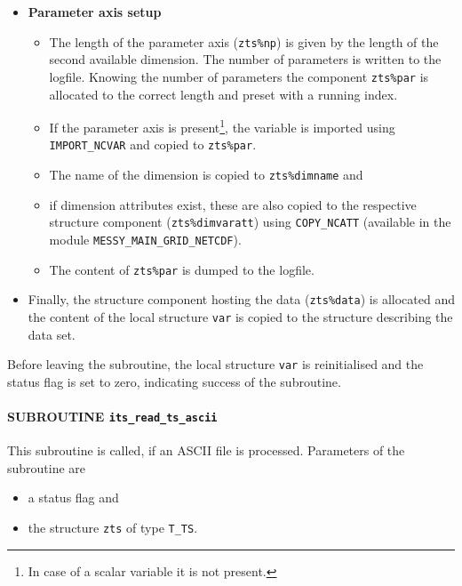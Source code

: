 \documentclass[11pt,twoside]{report}
\begin{document}
\begin{itemize}
\begin{itemize}
{to ``days'') is required (i.e., 24). The offset between the start date
and time (``2000-08-01 00:00:00'') and the 0th julian day is calculated.}.
\end{itemize}
\item {\bf Parameter axis setup}
\begin{itemize}
\item The length of the parameter axis (\verb|zts%np|) is given by the
length of the  
second available dimension. The number of parameters is written to the logfile.
Knowing the number of parameters the component \verb|zts%par| is allocated to 
the correct length and preset with a running index.
\item If the parameter axis is present\footnote{In case of a scalar
variable it is not present.}, the variable is imported
using \verb|IMPORT_NCVAR| and copied to  \verb|zts%par|. 
\item The name of the dimension is copied to
\verb|zts%dimname| and 
\item if dimension attributes exist, these are also copied
to the respective structure component (\verb|zts%dimvaratt|) using 
\verb|COPY_NCATT| (available in the module \verb|MESSY_MAIN_GRID_NETCDF|).
\item The content of  \verb|zts%par| is dumped to the logfile.
\end{itemize}

\item Finally, the structure component hosting the data
(\verb|zts%data|) is allocated and the 
content of the local structure \verb|var| is copied to the structure
describing the data set.
\end{itemize}

 Before leaving the subroutine, the local structure \verb|var| is reinitialised
 and the status flag is set to zero, indicating success of the
 subroutine.

\paragraph{SUBROUTINE \color{blue} \tt\bf its\_read\_ts\_ascii\label{ITSreadasc}\\}
This subroutine is called, if an ASCII file is processed. Parameters of the
subroutine are 
\begin{itemize}
\item a status flag and 
\item the structure \verb|zts| of type \verb|T_TS|.
\end{itemize}
\end{document}
